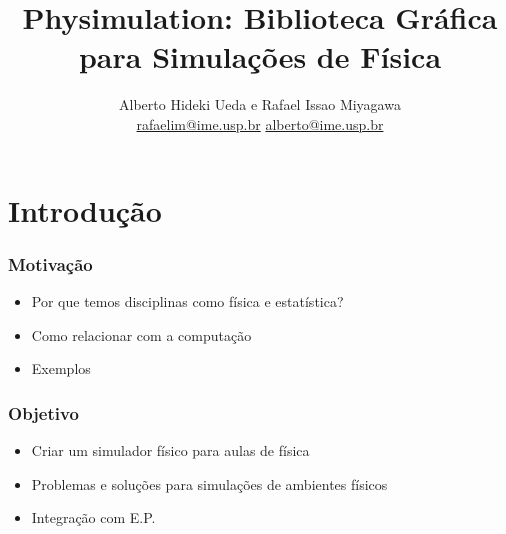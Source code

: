 \documentclass{beamer}
\title{Physimulation: Biblioteca Gráfica para Simulações de Física}
\author{Alberto Hideki Ueda e Rafael Issao Miyagawa\\ \url{rafaelim@ime.usp.br} \url{alberto@ime.usp.br}}
\institute{Instituto de Matemática e Estatística\\Universidade de São Paulo}
\begin{document}
\frame{\titlepage}
\frame{\tableofcontents}
\section{Introdução}
\begin{frame}
  \frametitle{Motivação}
  \begin{itemize}
    \item Por que temos disciplinas como física e estatística?
    \item Como relacionar com a computação
    \item Exemplos
  \end{itemize} 
\end{frame}
\begin{frame}
  \frametitle{Objetivo}
  \begin{itemize}
    \item Criar um simulador físico para aulas de física
    \item Problemas e soluções para simulações de ambientes físicos
    \item Integração com E.P.
  \end{itemize}
\end{frame}
\end{document}
